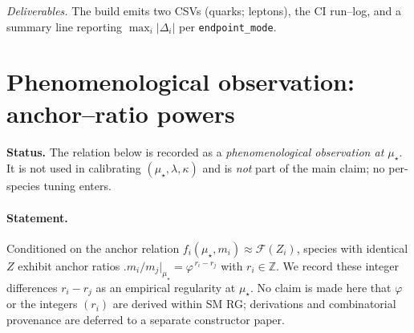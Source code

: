\documentclass[epjc3]{svjour3}
\begin{document}
\medskip
\noindent\emph{Deliverables.} The build emits two CSVs (quarks; leptons), the CI run–log, and a summary line reporting \(\max_i|\Delta_i|\) per \texttt{endpoint\_mode}.%


\section{Phenomenological observation: anchor–ratio powers}

\noindent\textbf{Status.} The relation below is recorded as a \emph{phenomenological observation at $\mu_\star$}. It is not used in calibrating $(\mu_\star,\lambda,\kappa)$ and is \emph{not} part of the main claim; no per-species tuning enters.

\paragraph{Statement.}
Conditioned on the anchor relation $f_i(\mu_\star,m_i) \approx \mathcal F(Z_i)$, species with identical $Z$ exhibit anchor ratios $\bigl.m_i/m_j\bigr|_{\mu_\star}=\varphi^{\,r_i-r_j}$ with $r_i\in\mathbb Z$. We record these integer differences $r_i-r_j$ as an empirical regularity at $\mu_\star$. No claim is made here that $\varphi$ or the integers $(r_i)$ are derived within SM RG; derivations and combinatorial provenance are deferred to a separate constructor paper.
\end{document}

